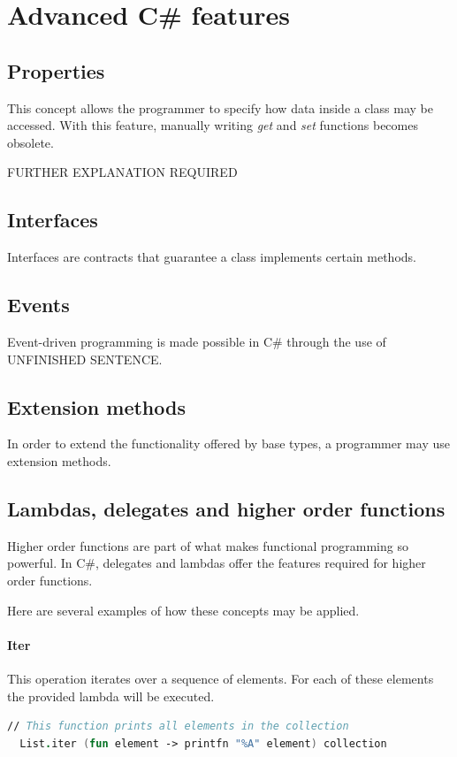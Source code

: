 \documentclass{article}
\begin{document}
\newpage

\section{Advanced C\# features}
\subsection{Properties}
This concept allows the programmer to specify how data inside a class may be accessed.
With this feature, manually writing {\em get} and {\em set} functions becomes obsolete.

{\huge FURTHER EXPLANATION REQUIRED}

\subsection{Interfaces}
Interfaces are contracts that guarantee a class implements certain methods.

\subsection{Events}
Event-driven programming is made possible in C\# through the use of {\huge UNFINISHED SENTENCE}.

\subsection{Extension methods}
In order to extend the functionality offered by base types, a programmer may use extension methods.

\subsection{Lambdas, delegates and higher order functions}
Higher order functions are part of what makes functional programming so powerful.
In C\#, delegates and lambdas offer the features required for higher order functions.

Here are several examples of how these concepts may be applied.

\paragraph{Iter}
This operation iterates over a sequence of elements. For each of these elements the provided lambda will be executed.

\begin{lstlisting}[language=Fsharp]
  // This function prints all elements in the collection
  List.iter (fun element -> printfn "%A" element) collection
\end{lstlisting}
\end{document}
